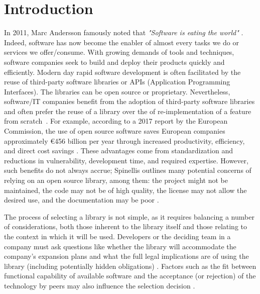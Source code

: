 \documentclass[sigconf,review,anonymous, table]{acmart}
\begin{document}
\maketitle
\balance
\section{Introduction}
In 2011, Marc Andersson famously noted that \textit{"Software is eating the world"} \cite{website:eat-world}. Indeed, software has now become the enabler of almost every tasks we do or services we offer/consume. With growing demands of tools and techniques, software companies seek to build and deploy their products quickly and efficiently. Modern day rapid software development is often facilitated by the reuse of third-party software libraries or APIs (Application Programming Interfaces). The libraries can be open source or proprietary. Nevertheless, software/IT companies benefit from the adoption of third-party software libraries and often prefer the reuse of a library over the of re-implementation of a feature from scratch~\cite{uddin2017opiner}. For example, according to a 2017 report by the European Commission, the use of open source software saves European companies approximately \euro456 billion per year through increased productivity, efficiency, and direct cost savings \cite{eu2017economic}. These advantages come from standardization and reductions in vulnerability, development time, and required expertise. However, such benefits do not always accrue; Spinellis outlines many potential concerns of relying on an open source library, among them: the project might not be maintained, the code may not be of high quality, the license may not allow the desired use, and the documentation may be poor \cite{spinellis2019select}.

The process of selecting a library is not simple, as it requires balancing a number of considerations, both those inherent to the library itself and those relating to the context in which it will be used. Developers or the deciding team in a company must ask questions like whether the library will accommodate the company's expansion plans and what the full legal implications are of using the library (including potentially hidden obligations) 
\cite{spinellis2019select,wolter:2022:open}. Factors such as the fit between functional capability of available software and the acceptance (or rejection) of the technology by peers may also influence the selection decision \cite{dishaw1998supporting,eckhardt2009influences}. %
\end{document}
